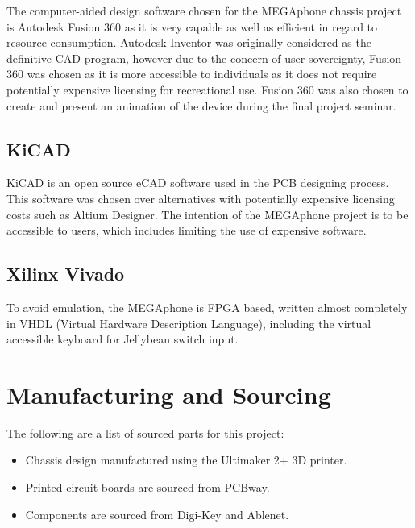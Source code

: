 The computer-aided design software chosen for the MEGAphone chassis project is Autodesk Fusion 360 as it is very capable as well as efficient in regard to resource consumption. 
Autodesk Inventor was originally considered as the definitive CAD program, however due to the concern of user sovereignty, Fusion 360 was chosen as it is more accessible to individuals as it does not require potentially expensive licensing for recreational use. 
Fusion 360 was also chosen to create and present an animation of the device during the final project seminar.


\subsection{KiCAD}

KiCAD is an open source eCAD software used in the PCB designing process. 
This software was  chosen over alternatives with potentially expensive licensing costs such as Altium Designer. 
The intention of the MEGAphone project is to be accessible to users, which includes limiting the use of expensive software.


\subsection{Xilinx Vivado}

To avoid emulation, the MEGAphone is FPGA based, written almost completely in VHDL (Virtual Hardware Description Language), including the virtual accessible keyboard for Jellybean switch input.


\section{Manufacturing and Sourcing}

The following are a list of sourced parts for this project:

\begin{itemize} 
    \item Chassis design manufactured using the Ultimaker 2+ 3D printer.
    \item Printed circuit boards are sourced from PCBway.
    \item Components are sourced from Digi-Key and Ablenet.
    \end{itemize}

